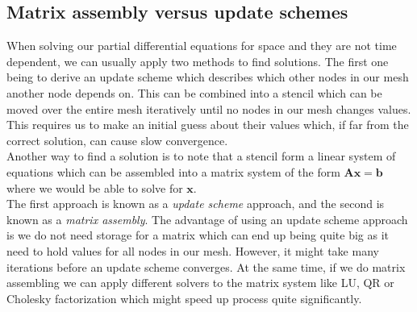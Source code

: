 \subsection{Matrix assembly versus update schemes}
When solving our partial differential equations for space and they are not time dependent, we can usually apply two methods to find solutions. The first one being to derive an update scheme which describes which other nodes in our mesh another node depends on. This can be combined into a stencil which can be moved over the entire mesh iteratively until no nodes in our mesh changes values. This requires us to make an initial guess about their values which, if far from the correct solution, can cause slow convergence.\\
Another way to find a solution is to note that a stencil form a linear system of equations which can be assembled into a matrix system of the form $\mathbf{A}\mathbf{x} = \mathbf{b}$ where we would be able to solve for $\mathbf{x}$.\\
The first approach is known as a \textit{update scheme} approach, and the second is known as a \textit{matrix assembly}. The advantage of using an update scheme approach is we do not need storage for a matrix which can end up being quite big as it need to hold values for all nodes in our mesh. However, it might take many iterations before an update scheme converges. At the same time, if we do matrix assembling we can apply different solvers to the matrix system like LU, QR or Cholesky factorization which might speed up process quite significantly.